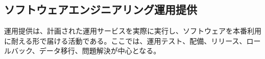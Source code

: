 \subsection{ソフトウェアエンジニアリング運用提供}

運用提供は、計画された運用サービスを実際に実行し、ソフトウェアを本番利用に耐える形で届ける活動である。ここでは、運用テスト、配備、リリース、ロールバック、データ移行、問題解決が中心となる。
